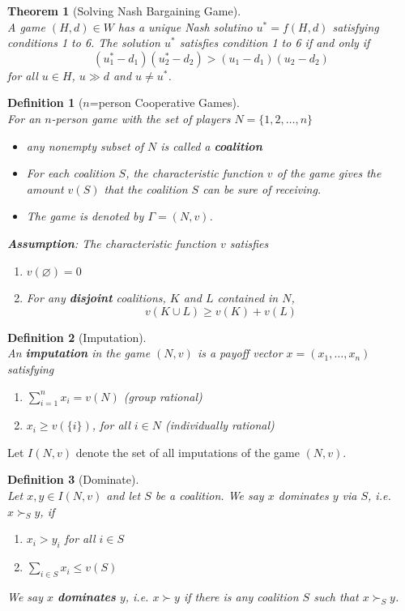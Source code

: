 \documentclass[12pt]{article}
\newtheorem{definition}{Definition}[section]
\newtheorem{theorem}{Theorem}[section]
\theoremstyle{definition}
\begin{document}
\begin{theorem}[Solving Nash Bargaining Game]
\hfill\\\normalfont A game $(H, d)\in W$ has a unique Nash solutino $u^\ast=f(H, d)$ satisfying conditions 1 to 6. The solution $u^\ast$ satisfies condition 1 to 6 if and only if
\[
(u_1^\ast - d_1)(u_2^\ast -d_2)>(u_1-d_1)(u_2-d_2)
\]
for all $u\in H$, $u\gg d$ and $u\neq u^\ast$.
\end{theorem}
\begin{definition}[{$n$}=person Cooperative Games]
\hfill\\\normalfont For an $n$-person game with the set of players $N=\{1,2,\ldots, n\}$
\begin{itemize}
  \item any nonempty subset of $N$ is called a \textbf{coalition}
  \item For each coalition $S$, the characteristic function $v$ of the game gives the amount $v(S)$ that the coalition $S$ can be sure of receiving.
  \item The game is denoted by $\Gamma = (N, v)$.
\end{itemize}
\textbf{Assumption}: The characteristic function $v$ satisfies
\begin{enumerate}
  \item $v(\varnothing)=0$
  \item For any \textbf{disjoint} coalitions, $K$ and $L$ contained in $N$, 
  \[
v(K\cup L)\geq v(K)+v(L)
  \]
\end{enumerate}
\end{definition}
\begin{definition}[Imputation]
\hfill\\\normalfont An \textbf{imputation} in the game $(N, v)$ is a payoff vector $x=(x_1,\ldots, x_n)$ satisfying
\begin{enumerate}
  \item $\sum_{i=1}^n x_i=v(N)$ (group rational)
  \item $x_i\geq v(\{i\})$, for all $i\in N$ (individually rational)
\end{enumerate}
\end{definition}
Let $I(N, v)$ denote the set of all imputations of the game $(N, v)$.
\begin{definition}[Dominate]
\hfill\\\normalfont Let $x, y\in I(N, v)$ and let $S$ be a coalition. We say $x$ dominates $y$ via $S$, i.e. $x\succ_S y$, if
\begin{enumerate}
  \item $x_i>y_i$ for all $i\in S$
  \item $\sum_{i\in S} x_i \leq v(S)$
\end{enumerate}
We say $x$ \textbf{dominates} $y$, i.e. $x\succ y$ if there is \textit{any} coalition $S$ such that $x\succ_S y$.
\end{definition}
\end{document}
